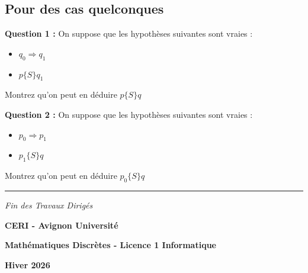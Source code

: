 \documentclass[a4paper,11pt]{article}
\begin{document}
\subsection{Pour des cas quelconques}

\textbf{Question 1 :} On suppose que les hypothèses suivantes sont vraies :
\begin{itemize}
    \item $q_0 \Rightarrow q_1$
    \item $p\{S\}q_1$
\end{itemize}
Montrez qu'on peut en déduire $p\{S\}q$

\textbf{Question 2 :} On suppose que les hypothèses suivantes sont vraies :
\begin{itemize}
    \item $p_0 \Rightarrow p_1$
    \item $p_1\{S\}q$
\end{itemize}
Montrez qu'on peut en déduire $p_0\{S\}q$

\vspace{2cm}

\begin{center}
\rule{10cm}{0.5pt}

\vspace{0.5cm}

\textit{Fin des Travaux Dirigés}

\vspace{0.5cm}

\textbf{CERI - Avignon Université}

\textbf{Mathématiques Discrètes - Licence 1 Informatique}

\textbf{Hiver 2026}
\end{center}
\end{document}
